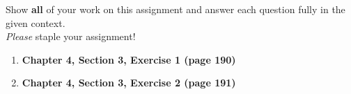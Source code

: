 \documentclass[11pt]{article}
\newcommand{\ben}{\begin{enumerate}}
\newcommand{\een}{\end{enumerate}}
\begin{document}
\pagestyle{fancy} 

Show \textbf{all} of your work on this assignment and answer each question fully in the given context. \\

\emph{Please} staple your assignment! \\

\ben

\item \textbf{Chapter 4, Section 3, Exercise 1 (page 190)}

\item \textbf{Chapter 4, Section 3, Exercise 2 (page 191)}

\een
\end{document}
